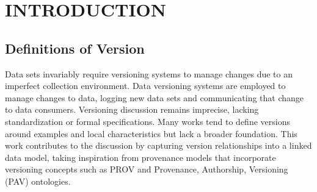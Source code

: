 
\chapter{INTRODUCTION}

\section{Definitions of Version} \label{sec:def}

Data sets invariably require versioning systems to manage changes due to an imperfect collection environment.
Data versioning systems are employed to manage changes to data, logging new data sets and communicating that change to data consumers.
Versioning discussion remains imprecise, lacking standardization or formal specifications.
Many works tend to define versions around examples and local characteristics but lack a broader foundation.
This work contributes to the discussion by capturing version relationships into a linked data model, taking inspiration from provenance models that incorporate versioning concepts such as PROV and Provenance, Authorship, Versioning (PAV) ontologies.

